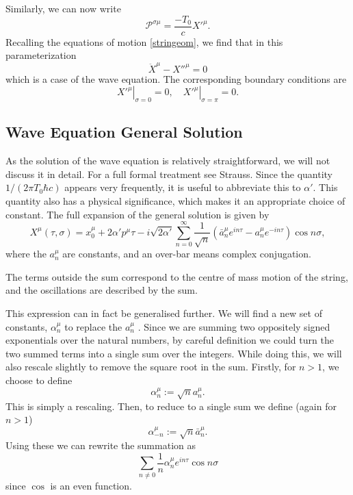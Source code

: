 \documentclass[a4paper,12pt]{article}
\numberwithin{equation}{section}
\begin{document}
Similarly, we can now write
\begin{equation}
\mathcal{P}^{\sigma \mu} = \frac{-T_0}{c} X'^\mu.
\end{equation}
Recalling the equations of motion \ref{stringeom}, we find that in this parameterization
\begin{equation}
\ddot{X}^\mu -X''^\mu = 0
\end{equation}
which is a case of the wave equation. The corresponding boundary conditions are
\begin{equation}
\left.X'^\mu \right|_{\sigma = 0} = 0, \quad\left. X'^\mu \right|_{\sigma = \pi} = 0. 
\end{equation}

\subsection{Wave Equation General Solution}\label{wegs}
As the solution of the wave equation is relatively straightforward, we will not discuss it in detail. For a full formal treatment see Strauss\cite{strauss}.
Since the quantity $1/(2\pi T_0 \hbar c)$ appears very frequently, it is useful to abbreviate this to $\alpha'$. This quantity also has a physical significance, which makes it an appropriate choice of constant.
The full expansion of the general solution is given by
\begin{equation}
X^\mu (\tau, \sigma) = x_0^\mu + 2\alpha' p^\mu \tau - i\sqrt{2\alpha'}\sum_{n=0}^\infty \frac{1}{\sqrt{n}}\left(\bar{a}_n^\mu e^{in\tau} - a_n^\mu e^{-in\tau}\right) \cos n\sigma,
\end{equation}
where the $a_n^\mu$ are constants, and an over-bar means complex conjugation.

The terms outside the sum correspond to the centre of mass motion of the string, and the oscillations are described by the sum.

This expression can in fact be generalised further. We will find a new set of constants, $\alpha_n^\mu$ to replace the $a_n^\mu$ . Since we are summing two oppositely signed exponentials over the natural numbers, by careful definition we could turn the two summed terms into a single sum over the integers. While doing this, we will also rescale slightly to remove the square root in the sum. Firstly, for $n>1$, we choose to define 
\begin{equation}\label{atoalpha1}
\alpha_n^\mu := \sqrt{n} a_n^\mu.
\end{equation} 
This is simply a rescaling. Then, to reduce to a single sum we define (again for $n>1$)
\begin{equation}\label{atoalpha2}
\alpha_{-n}^\mu := \sqrt{n}\bar{a}_n^\mu. 
\end{equation}
Using these we can rewrite the summation as
\begin{equation}
\sum_{n \ne 0} \frac{1}{n}\alpha_n^\mu e^{in\tau}\cos n\sigma
\end{equation}
since $\cos$ is an even function.
\end{document}

